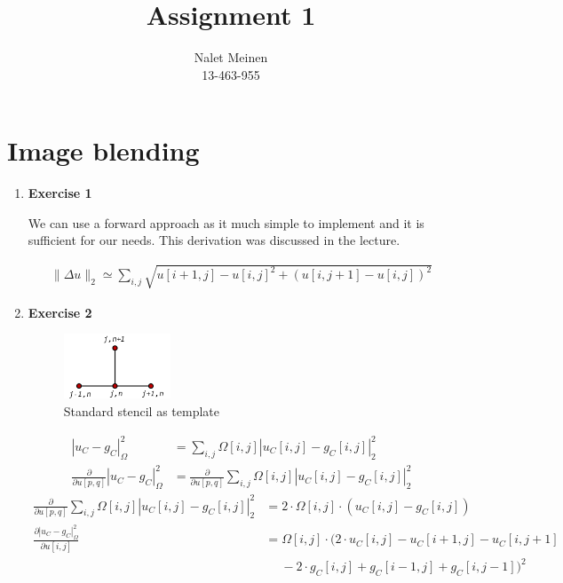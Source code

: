 \documentclass{paper}
\title{Assignment 1}
\author{Nalet Meinen\\13-463-955}
\begin{document}
\maketitle


%

\section*{Image blending}

\begin{enumerate}
\item \textbf{Exercise 1}

We can use a forward approach as it much simple to implement and it is sufficient for our needs. This derivation was discussed in the lecture.

\begin{align*}
   \lVert \Delta u \rVert_2 \simeq \sum_{i,j} \sqrt{ u[i+1,j] - u[i,j]^2 + ( u[i,j + 1] - u[i,j] )^2 }
\end{align*}

\item \textbf{Exercise 2}

\begin{figure}[!htb]
   \centering
   \includegraphics[width=0.3\textwidth]{images/stencil.png}
   \caption{Standard stencil as template}
 \end{figure}

\begin{align*}
   |u_C-g_C|^2_\Omega &= \sum_{i,j} \Omega[i,j] | u_C[i,j] - g_C[i,j] |^2_2 \\
   \frac{\partial}{\partial u[p,q]} |u_C-g_C|^2_\Omega &= \frac{\partial}{\partial u[p,q]} \sum_{i,j} \Omega[i,j] | u_C[i,j] - g_C[i,j] |^2_2
\end{align*}
\begin{align*}
   \frac{\partial}{\partial u[p,q]} \sum_{i,j} \Omega[i,j] | u_C[i,j] - g_C[i,j] |^2_2 &= 2 \cdot \Omega[i,j] \cdot ( u_C[i,j] - g_C[i,j] ) \\
   \frac{\partial |u_C-g_C|^2_\Omega}{\partial u[i,j]} &= \Omega[i,j] \cdot ( 2 \cdot u_C[i,j] - u_C[i+1,j] - u_C[i,j+1] \\
   & \quad \; - 2 \cdot g_C[i,j] + g_C[i-1,j] + g_C[i,j-1] )^2
\end{align*}


\end{enumerate}
\end{document}
